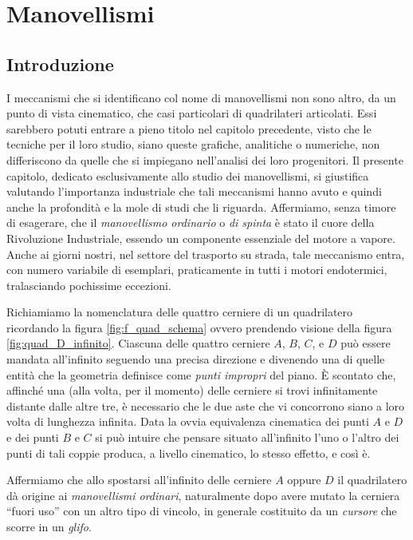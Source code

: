 \chapter{Manovellismi}

\section{Introduzione}

\noindent I meccanismi che si identificano col nome di 
manovellismi non sono altro, da un punto di vista cinematico, che
casi particolari di quadrilateri articolati. Essi sarebbero potuti entrare
a pieno titolo nel capitolo precedente, visto che le tecniche per
il loro studio, siano queste grafiche, analitiche o numeriche, non
differiscono da quelle che si  impiegano nell'analisi dei loro
progenitori. Il presente capitolo, dedicato esclusivamente allo studio dei
manovellismi, si giustifica valutando l'importanza industriale che 
tali meccanismi hanno
avuto e quindi anche la profondit\`a e la mole di studi che
li riguarda.
Affermiamo, senza timore di esagerare, che il
{\em manovellismo ordinario} o
{\em di spinta} \`e stato il cuore della
Rivoluzione Industriale, essendo un componente essenziale del motore a vapore.
Anche ai giorni nostri,  nel settore del trasporto su strada,
tale meccanismo entra, con numero
variabile di esemplari, praticamente in tutti i motori endotermici, tralasciando
pochissime eccezioni.

\noindent Richiamiamo la nomenclatura delle quattro cerniere
di un quadrilatero ricordando la figura \ref{fig:f_quad_schema} ovvero
prendendo visione della figura \ref{fig:quad_D_infinito}.
Ciascuna delle quattro cerniere $A$, $B$, $C$, e $D$ pu\`o essere mandata all'infinito
seguendo una precisa direzione e divenendo una di quelle
entit\`a che la geometria
definisce come {\em punti impropri} del piano.
\`E scontato che, affinch\'e una (alla volta, per il momento)
delle cerniere si trovi
infinitamente distante dalle altre tre, \`e necessario che le due aste
che vi concorrono siano a loro volta di lunghezza infinita.
\noindent Data la ovvia equivalenza cinematica dei punti $A$ e $D$ e dei punti
$B$ e $C$ si pu\`o intuire che pensare situato all'infinito l'uno o l'altro dei punti di
tali coppie produca, a livello cinematico, lo stesso effetto,
e cos\`i \`e.

\noindent Affermiamo che allo spostarsi all'infinito delle cerniere
$A$ oppure $D$ il quadrilatero d\`a origine ai {\em manovellismi ordinari}, naturalmente dopo avere mutato la cerniera 
``fuori uso'' con un altro tipo di vincolo, in generale costituito da un 
{\em cursore} che scorre in un {\em glifo}.

